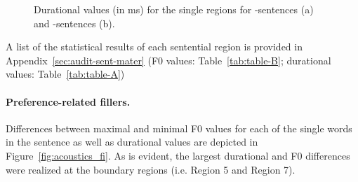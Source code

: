 \documentclass[fleqn,reqno,10pt,draft]{article}
\newcommand{\as}{\acro{as}}
\renewcommand{\es}{\acro{es}}
\begin{document}
\begin{figure}[ht]
{
	    \label{fig:duration_ge}
	}
	\caption[]{Durational values (in ms) for 
	the single regions for \as-sentences (a) and \es-sentences (b).}
	\label{fig:duration_targets}
\end{figure}

A list of the statistical results of each sentential region is provided in 
Appendix~\ref{sec:audit-sent-mater} (F0 values: Table~\ref{tab:table-B};
durational values: Table~\ref{tab:table-A})


\paragraph{Preference-related fillers.} 
Differences between maximal and minimal F0 values for each of the
single words in the sentence as well as durational values are depicted in
Figure~\ref{fig:acoustics_fi}. As is
evident, the largest durational and F0 differences were
realized at the boundary regions (i.e. Region 5 and Region
7). 
\end{document}
